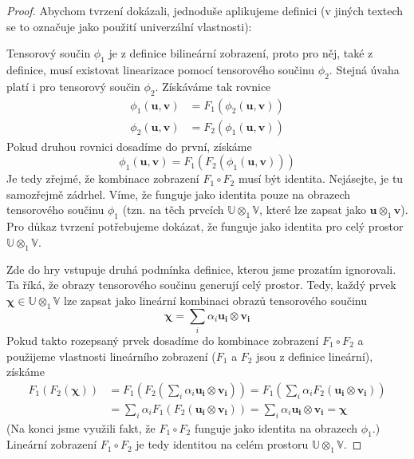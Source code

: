 \documentclass[a5paper,12pt]{amsbook}
\theoremstyle{definition}
\newcommand{\myvec}[1]{\mathbf{#1}}
\newcommand{\myspace}[1]{\mathbb{#1}}
\begin{document}
\begin{proof}
Abychom tvrzení dokázali, jednoduše aplikujeme definici (v jiných textech se to označuje jako
použití univerzální vlastnosti):
\begin{center}

\end{center}
Tensorový součin $\phi_1$ je z definice bilineární zobrazení, proto pro něj, také z definice, musí
existovat linearizace pomocí tensorového součinu $\phi_2$. Stejná úvaha platí i pro tensorový součin
$\phi_2$. Získáváme tak rovnice
\begin{equation*}
\begin{split}
\phi_1(\myvec{u}, \myvec{v}) &= F_1(\phi_2(\myvec{u}, \myvec{v})) \\
\phi_2(\myvec{u}, \myvec{v}) &= F_2(\phi_1(\myvec{u}, \myvec{v}))
\end{split}
\end{equation*}
Pokud druhou rovnici dosadíme do první, získáme
\begin{equation*}
\phi_1(\myvec{u}, \myvec{v}) = F_1(F_2(\phi_1(\myvec{u}, \myvec{v})))
\end{equation*}
Je tedy zřejmé, že kombinace zobrazení $F_1 \circ F_2$ musí být identita. Nejásejte, je tu samozřejmě
zádrhel. Víme, že funguje jako identita pouze na obrazech tensorového součinu $\phi_1$
(tzn. na těch prvcích $\myspace{U}\otimes_1\myspace{V}$, které lze zapsat jako
$\myvec{u}\otimes_1\myvec{v}$). Pro důkaz tvrzení potřebujeme dokázat, že funguje jako identita
pro celý prostor $\myspace{U}\otimes_1\myspace{V}$.

Zde do hry vstupuje druhá podmínka definice, kterou jsme prozatím ignorovali. Ta říká, že obrazy
tensorového součinu generují celý prostor. Tedy, každý prvek $\myvec{\chi}\in\myspace{U}\otimes_1\myspace{V}$
lze zapsat jako lineární kombinaci obrazů tensorového součinu
\begin{equation*}
\myvec{\chi} =  \sum_{i}\alpha_i\myvec{u_i}\otimes\myvec{v_i}
\end{equation*}
Pokud takto rozepsaný prvek dosadíme do kombinace zobrazení $F_1 \circ F_2$ a použijeme vlastnosti
lineárního zobrazení ($F_1$ a $F_2$ jsou z definice lineární), získáme
\begin{equation*}
\begin{split}
F_1(F_2(\myvec{\chi})) &= F_1(F_2(\sum_{i}\alpha_i\myvec{u_i}\otimes\myvec{v_i}))
  = F_1(\sum_{i}\alpha_i F_2(\myvec{u_i}\otimes\myvec{v_i})) \\
  &= \sum_{i}\alpha_i F_1(F_2(\myvec{u_i}\otimes\myvec{v_i}))
  = \sum_{i}\alpha_i\myvec{u_i}\otimes\myvec{v_i} = \myvec{\chi}
\end{split}
\end{equation*}
(Na konci jsme využili fakt, že $F_1 \circ F_2$ funguje jako identita na obrazech $\phi_1$.)
Lineární zobrazení $F_1 \circ F_2$ je tedy identitou na celém prostoru
$\myspace{U}\otimes_1\myspace{V}$.


\end{proof}
\end{document}

